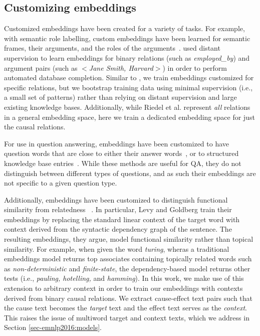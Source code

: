 \subsection{Customizing embeddings}
Customized embeddings have been created for a variety of tasks. %
For example, with semantic role labelling, custom embeddings have been learned for semantic frames, their arguments, and the roles of the arguments~\citep[e.g.,][]{fitzgerald2015semantic,woodsenddistributed}.  \citet{riedel2013relation} used distant supervision to learn embeddings for binary relations (such as \textit{employed\_by}) and argument pairs (such as $<$\textit{Jane Smith, Harvard}$>$) in order to perform automated database completion.  
Similar to \citeauthor{riedel2013relation}, we train embeddings customized for specific relations, but we bootstrap training data using minimal supervision (i.e., a small set of patterns) rather than relying on distant supervision and large existing knowledge bases.  Additionally, while Riedel et al. represent \textit{all} relations in a general embedding space, here we train a dedicated embedding space for just the causal relations. 

For use in question answering, embeddings have been customized to have question words that are close to either their answer words~\citep{bordes2014question}, or to structured knowledge base entries~\citep{yang2014joint}.  While these methods are useful for QA, they do not distinguish between different types of questions, and as such their embeddings are not specific to a given question type.

Additionally, embeddings have been customized to distinguish functional similarity from relatedness ~\citep{levy2014dependency,kielaspecializing}.
In particular, Levy and Goldberg train their embeddings by replacing the standard linear context of the target word with context derived from the syntactic dependency graph of the sentence.  The resulting embeddings, they argue, model functional similarity rather than topical similarity.  For example, when given the word \emph{turing}, wheras a traditional embeddings model returns top associates containing topically related words such as \emph{non-deterministic} and \emph{finite-state}, the dependency-based model returns other tests (i.e., \emph{pauling, hotelling,} and \emph{hamming}).
In this work, we make use of this extension to arbitrary context in order to train our embeddings with contexts derived from binary causal relations.  We extract cause-effect text pairs such that the cause text becomes the \emph{target} text and the effect text serves as the \emph{context}. This raises the issue of multiword target and context texts, which we address in Section \ref{sec-emnlp2016:models}.

